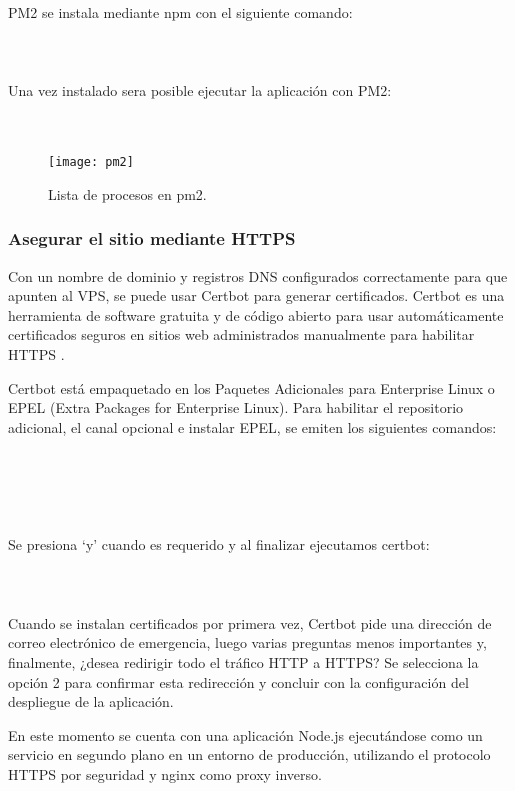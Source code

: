 PM2 se instala mediante npm con el siguiente comando:\\
\\
\\
\\
Una vez instalado sera posible ejecutar la aplicación con PM2:\\
\\
\\

\begin{figure}[H]
  \centering
  \texttt{[image: pm2]}
  \caption{Lista de procesos en pm2.}
\end{figure}

\subsubsection{Asegurar el sitio mediante HTTPS}
Con un nombre de dominio y registros DNS configurados correctamente para que apunten al VPS, se puede usar Certbot para generar certificados. Certbot es una herramienta de software gratuita y de código abierto para usar automáticamente certificados seguros en sitios web administrados manualmente para habilitar HTTPS \cite{certbot}.
\vspace{0.8cm}

Certbot está empaquetado en los Paquetes Adicionales para Enterprise Linux o EPEL (Extra Packages for Enterprise Linux). Para habilitar el repositorio adicional, el canal opcional e instalar EPEL, se emiten los siguientes comandos:\\
\\
\\
\\
\\
\\
Se presiona `y' cuando es requerido y al finalizar ejecutamos certbot:\\
\\
\\
\\
Cuando se instalan certificados por primera vez, Certbot pide una dirección de correo electrónico de emergencia, luego varias preguntas menos importantes y, finalmente, ¿desea redirigir todo el tráfico HTTP a HTTPS? Se selecciona la opción 2 para confirmar esta redirección y concluir con la configuración del despliegue de la aplicación.
\vspace{0.8cm}

En este momento se cuenta con una aplicación Node.js ejecutándose como un servicio en segundo plano en un entorno de producción, utilizando el protocolo HTTPS por seguridad y nginx como proxy inverso.
